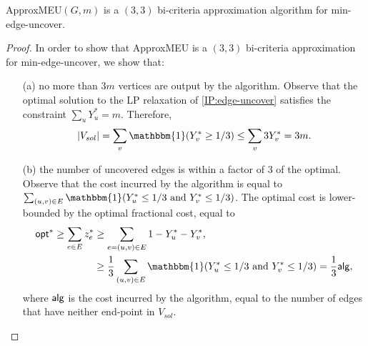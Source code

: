 \begin{theorem} \label{theorem:min-edge-uncover-alg-proof}
{\sf ApproxMEU}$(G,m)$ is a $(3,3)$ bi-criteria approximation algorithm for {\sf min-edge-uncover}.
\end{theorem}
\begin{proof}
In order to show that {\sf ApproxMEU} is a $(3,3)$ bi-criteria approximation for {\sf min-edge-uncover}, we show that:
\begin{enumerate}
    \item[(a)] no more than $3m$ vertices are output by the algorithm. Observe that the optimal solution to the LP relaxation of \ref{IP:edge-uncover} satisfies the constraint $\sum_u Y_u^* = m$. Therefore,
    \begin{equation*}
        |V_{sol}| = \sum_v \mathbbm{1} (Y_v^* \ge 1/3) \le \sum_v 3Y_v^* = 3m.
    \end{equation*}
    \item[(b)] the number of uncovered edges is within a factor of $3$ of the optimal. Observe that the cost incurred by the algorithm is equal to $\sum_{(u,v) \in E} \mathbbm{1} (Y_u^* \le 1/3 \text{ and } Y_v^* \le 1/3)$. The optimal cost is lower-bounded by the optimal fractional cost, equal to
\begin{align*}
    \opt^* \ge \sum_{e \in E} z_e^* &\ge \sum_{e = (u,v) \in E} 1 - Y_u^* - Y_v^*, \\
    &\ge \frac{1}{3} \sum_{(u,v) \in E} \mathbbm{1} (Y_u^* \le 1/3 \text{ and } Y_v^* \le 1/3) = \frac{1}{3} \alg,
\end{align*}
where $\mathsf{alg}$ is the cost incurred by the algorithm, equal to the number of edges that have neither end-point in $V_{sol}$.
\end{enumerate}
\end{proof}


